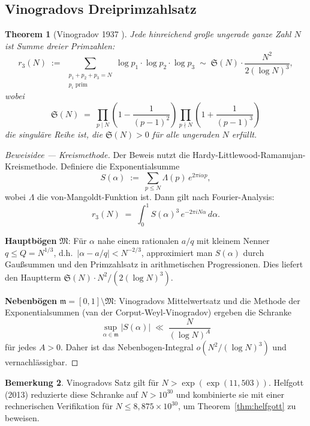 \documentclass[12pt,a4paper]{amsart}
\newtheorem{theorem}{Theorem}[section]
\theoremstyle{definition}
\newtheorem{bemerkung}[theorem]{Bemerkung}
\begin{document}
\subsection{Vinogradovs Dreiprimzahlsatz}

\begin{theorem}[Vinogradov 1937 \cite{Vinogradov1937}]\label{thm:vinogradov}
Jede hinreichend gro\ss{}e ungerade ganze Zahl $N$ ist Summe dreier
Primzahlen:
\[
  r_3(N) \;:=\; \sum_{\substack{p_1 + p_2 + p_3 = N \\ p_i \text{ prim}}}
  \log p_1 \cdot \log p_2 \cdot \log p_3
  \;\sim\;
  \mathfrak{S}(N) \cdot \frac{N^2}{2(\log N)^3},
\]
wobei
\[
  \mathfrak{S}(N) \;=\;
  \prod_{p \mid N} \left(1 - \frac{1}{(p-1)^2}\right)
  \prod_{p \nmid N} \left(1 + \frac{1}{(p-1)^3}\right)
\]
die \emph{singuläre Reihe} ist, die $\mathfrak{S}(N) > 0$ f\"{u}r alle
ungeraden $N$ erf\"{u}llt.
\end{theorem}

\begin{proof}[Beweisidee --- Kreismethode]
Der Beweis nutzt die Hardy-Littlewood-Ramanujan-Kreismethode.
Definiere die Exponentialsumme
\[
  S(\alpha) \;:=\; \sum_{p \leq N} \Lambda(p)\, e^{2\pi i \alpha p},
\]
wobei $\Lambda$ die von-Mangoldt-Funktion ist.  Dann gilt
nach Fourier-Analysis:
\[
  r_3(N) \;=\; \int_0^1 S(\alpha)^3\, e^{-2\pi i N \alpha}\, d\alpha.
\]

\textbf{Hauptb\"{o}gen} $\mathfrak{M}$:
F\"{u}r $\alpha$ nahe einem rationalen $a/q$ mit kleinem Nenner
$q \leq Q = N^{1/3}$, d.h.\ $|\alpha - a/q| < N^{-2/3}$, approximiert
man $S(\alpha)$ durch Gau\ss{}summen und den Primzahlsatz in
arithmetischen Progressionen.  Dies liefert den Hauptterm
$\mathfrak{S}(N) \cdot N^2/(2(\log N)^3)$.

\textbf{Nebenb\"{o}gen} $\mathfrak{m} = [0,1] \setminus \mathfrak{M}$:
Vinogradovs Mittelwertsatz und die Methode der Exponentialsummen
(van der Corput-Weyl-Vinogradov) ergeben die Schranke
\[
  \sup_{\alpha \in \mathfrak{m}} |S(\alpha)| \;\ll\; \frac{N}{(\log N)^A}
\]
f\"{u}r jedes $A > 0$.  Daher ist das Nebenbogen-Integral
$o\!\left(N^2/(\log N)^3\right)$ und vernachl\"{a}ssigbar.
\end{proof}

\begin{bemerkung}
Vinogradovs Satz gilt f\"{u}r $N > \exp(\exp(11{,}503))$.
Helfgott (2013) reduzierte diese Schranke auf $N > 10^{30}$ und
kombinierte sie mit einer rechnerischen Verifikation f\"{u}r
$N \leq 8{,}875 \times 10^{30}$, um Theorem~\ref{thm:helfgott}
zu beweisen.
\end{bemerkung}
\end{document}
